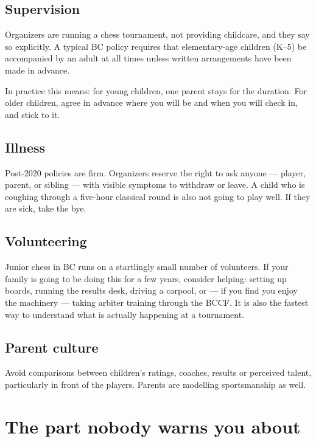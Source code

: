 \documentclass[10pt,letterpaper]{article}
\begin{document}
\subsection{Supervision}

Organizers are running a chess tournament, not providing childcare, and they say
so explicitly. A typical BC policy requires that elementary-age children (K--5)
be accompanied by an adult at all times unless written arrangements have been
made in advance.

In practice this means: for young children, one parent stays for the duration.
For older children, agree in advance where you will be and when you will check
in, and stick to it.

\subsection{Illness}

Post-2020 policies are firm. Organizers reserve the right to ask anyone ---
player, parent, or sibling --- with visible symptoms to withdraw or leave. A
child who is coughing through a five-hour classical round is also not going to
play well. If they are sick, take the bye.

\subsection{Volunteering}

Junior chess in BC runs on a startlingly small number of volunteers. If your
family is going to be doing this for a few years, consider helping: setting up
boards, running the results desk, driving a carpool, or --- if you find you enjoy
the machinery --- taking arbiter training through the BCCF. It is also the
fastest way to understand what is actually happening at a tournament.

\subsection{Parent culture}
Avoid comparisons between children’s ratings, coaches, results or perceived talent, particularly in front of the players. Parents are modelling sportsmanship as well.

\section{The part nobody warns you about}
\label{sec:emotional}
\end{document}
